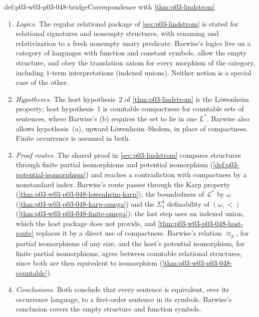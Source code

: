 \begin{hbconvention}{def:p03-w03-p03-048-bridge}{Correspondence with \cref{thm:p03-lindstrom}}
\begin{enumerate}
\item \emph{Logics.}  The regular relational package of
      \cref{sec:p03-lindstrom} is stated for relational signatures and
      nonempty structures, with renaming and relativization to a fresh
      nonempty unary predicate.  Barwise's logics live on a category of
      languages with function and constant symbols, allow the empty
      structure, and obey the translation axiom for every morphism of the
      category, including \(1\)-term interpretations (indexed unions).
      Neither notion is a special case of the other.
\item \emph{Hypotheses.}  The host hypothesis~2 of \cref{thm:p03-lindstrom}
      is the L\"owenheim property; host hypothesis~1 is countable
      compactness for countable sets of sentences, where Barwise's (b)
      requires the set to lie in one \(L^{\ast}\).  Barwise also allows
      hypothesis~(a), upward L\"owenheim--Skolem, in place of compactness.
      Finite occurrence is assumed in both.
\item \emph{Proof routes.}  The shared proof in
      \cref{sec:p03-lindstrom} compares structures through finite partial
      isomorphisms and potential isomorphism
      (\cref{def:p03-potential-isomorphism}) and reaches a contradiction with
      compactness by a nonstandard index.  Barwise's route passes through
      the Karp property (\cref{thm:p03-w03-p03-048-lowenheim-karp}), the
      boundedness of \(\mathcal L^{\ast}\) by \(\omega\)
      (\cref{thm:p03-w03-p03-048-karp-omega}) and the \(\Sigma^1_1\)
      definability of \((\omega,<)\) (\cref{thm:p03-w03-p03-048-finite-omega});
      the last step uses an indexed union, which the host package does not
      provide, and \cref{thm:p03-w03-p03-048-host-route} replaces it by a
      direct use of compactness.  Barwise's relation \(\cong_{p}\), for partial isomorphisms
      of any size, and the host's potential isomorphism, for finite partial
      isomorphisms, agree between countable relational structures, since
      both are then equivalent to isomorphism
      (\cref{thm:p03-w03-p03-048-countable}).
\item \emph{Conclusions.}  Both conclude that every sentence is equivalent,
      over its occurrence language, to a first-order sentence in its
      symbols.  Barwise's conclusion covers the empty structure and
      function symbols.
\end{enumerate}
\end{hbconvention}


